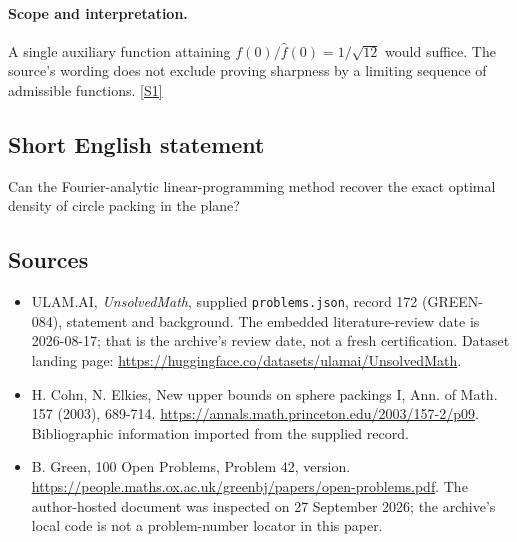 \documentclass[11pt,a4paper]{article}
\newcommand{\sref}[2]{\hyperlink{source:#1:#2}{[S#2]}}
\begin{document}
\paragraph{Scope and interpretation.}

A single auxiliary function attaining $f(0)/\widehat f(0)=1/\sqrt{12}$ would suffice. The source’s wording does not exclude proving sharpness by a limiting sequence of admissible functions. \sref{172}{1}

\subsection{Short English statement}

Can the Fourier-analytic linear-programming method recover the exact optimal density of circle packing in the plane?

\subsection{Sources}

{\small

\begin{itemize}

\item[\hypertarget{source:172:1}{S1}] ULAM.AI, \emph{UnsolvedMath}, supplied \texttt{problems.json}, record 172 (GREEN-084), statement and background. The embedded literature-review date is 2026-08-17; that is the archive’s review date, not a fresh certification. Dataset landing page: \url{https://huggingface.co/datasets/ulamai/UnsolvedMath}.

\item[\hypertarget{source:172:2}{S2}] H. Cohn, N. Elkies, New upper bounds on sphere packings I, Ann. of Math. 157 (2003), 689-714. \url{https://annals.math.princeton.edu/2003/157-2/p09}. Bibliographic information imported from the supplied record.

\item[\hypertarget{source:172:3}{S3}] B. Green, 100 Open Problems, Problem 42, version. \url{https://people.maths.ox.ac.uk/greenbj/papers/open-problems.pdf}. The author-hosted document was inspected on 27 September 2026; the archive’s local code is not a problem-number locator in this paper.

\end{itemize}

}

\label{end:172}
\end{document}
